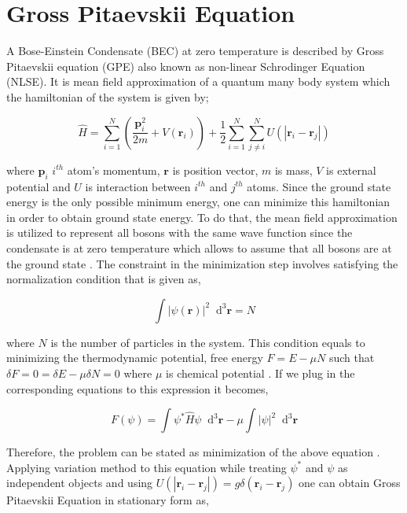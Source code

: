 \documentclass[a4paper,times,hidelinks,12pt]{article}
\newcommand*\dif{\mathop{}\!\mathrm{d}}
\begin{document}
\section{Gross Pitaevskii Equation}

A Bose-Einstein Condensate (BEC) at zero temperature is described by Gross Pitaevskii equation (GPE) also known as non-linear Schrodinger Equation (NLSE). It is mean field approximation of a quantum many body system which the hamiltonian of the system is given by;

\begin{equation}
\label{eq:GPE_hamiltonian}
\hat{H} = \sum_{i = 1}^{N} \left(\frac{\boldsymbol{p}_i^2}{2m} + V(\boldsymbol{r}_i) \right) + \frac{1}{2} \sum_{i = 1}^{N} \sum_{j \neq i}^{N} U(|\boldsymbol{r}_i - \boldsymbol{r}_j|)
\end{equation}

\noindent where $\boldsymbol{p}_i$ $i^{th}$ atom's momentum, $\boldsymbol{r}$ is position vector, $m$ is mass, $V$ is external potential and $U$ is interaction between $i^{th}$ and $j^{th}$  atoms. Since the ground state energy is the only possible minimum energy, one can minimize this hamiltonian in order to obtain ground state energy. To do that, the mean field approximation is utilized to represent all bosons with the same wave function since the condensate is at zero temperature which allows to assume that all bosons are at the ground state \cite{pethick2002bose}. The constraint in the minimization step involves satisfying the normalization condition that is given as,


\begin{equation}
\label{eq:GPE_normalization}
\int |\psi(\boldsymbol{r})|^2 \dif^3 \boldsymbol{r} = N    
\end{equation}

\noindent where $N$ is the number of particles in the system. This condition equals to minimizing the thermodynamic potential, free energy $F = E - \mu N$ such that $\delta F = 0 = \delta E - \mu \delta N = 0$ where $\mu$ is chemical potential \cite{pethick2002bose}. If we plug in the corresponding equations to this expression it becomes,  

\begin{equation}
\label{eq:GPE_derivation_free_energy}
F(\psi) = \int \psi^{*}\hat{H}\psi \dif^3\boldsymbol{r} - \mu \int |\psi|^2 \dif^3\boldsymbol{r}
\end{equation}

\noindent Therefore, the problem can be stated as minimization of the above equation \cite{rogel2013gross}. Applying variation method to this equation while treating $\psi^{*}$
and $\psi$ as independent objects and using $U(|\boldsymbol{r}_i - \boldsymbol{r}_j|) = g\delta(\boldsymbol{r}_i - \boldsymbol{r}_j)$ one can obtain Gross Pitaevskii Equation in stationary form as, 
\end{document}
